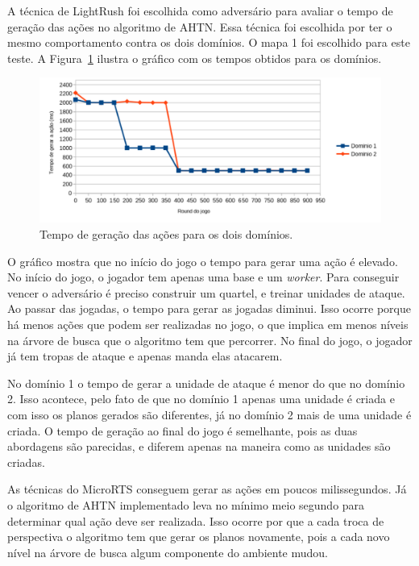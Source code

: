 A técnica de LightRush foi escolhida como adversário para avaliar o tempo de geração das ações no algoritmo de AHTN.
Essa técnica foi escolhida por ter o mesmo comportamento contra os dois domínios.
O mapa 1 foi escolhido para este teste.
A Figura~\ref{fig:tempo} ilustra o gráfico com os tempos obtidos para os domínios.

\begin{figure}[ht]
	\centering
	\includegraphics[width=.9\textwidth]{fig/graph.pdf}
	\caption{Tempo de geração das ações para os dois domínios.}
	\label{fig:tempo}
\end{figure}

O gráfico mostra que no início do jogo o tempo para gerar uma ação é elevado.
No início do jogo, o jogador tem apenas uma base e um \textit{worker}.
Para conseguir vencer o adversário é preciso construir um quartel, e treinar unidades de ataque.
Ao passar das jogadas, o tempo para gerar as jogadas diminui.
Isso ocorre porque há menos ações que podem ser realizadas no jogo, o que implica em menos níveis na árvore de busca que o algoritmo tem que percorrer.
No final do jogo, o jogador já tem tropas de ataque e apenas manda elas atacarem.

No domínio 1 o tempo de gerar a unidade de ataque é menor do que no domínio 2.
Isso acontece, pelo fato de que no domínio 1 apenas uma unidade é criada e com isso os planos gerados são diferentes, já no domínio 2 mais de uma unidade é criada.
O tempo de geração ao final do jogo é semelhante, pois as duas abordagens são parecidas, e diferem apenas na maneira como as unidades são criadas.

As técnicas do MicroRTS conseguem gerar as ações em poucos milissegundos.
Já o algoritmo de AHTN implementado leva no mínimo meio segundo para determinar qual ação deve ser realizada.
Isso ocorre por que a cada troca de perspectiva o algoritmo tem que gerar os planos novamente, pois a cada novo nível na árvore de busca algum componente do ambiente mudou.


